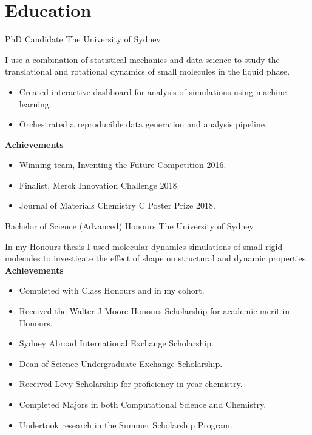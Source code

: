 



\makecvtitle{}

\vspace{-4em}
\section{Education}

{PhD Candidate}
{The University of Sydney}{}{}
{%
  I use a combination of statistical mechanics and data science to
  study the translational and rotational dynamics
  of small molecules in the liquid phase.
\begin{itemize}
  \item Created interactive dashboard for analysis of simulations
    using machine learning.
  \item Orchestrated a reproducible data generation and analysis pipeline.
\end{itemize}
\textbf{Achievements}
\begin{itemize}
  \item Winning team, Inventing the Future Competition 2016.
  \item Finalist, Merck Innovation Challenge 2018.
  \item Journal of Materials Chemistry C Poster Prize 2018.
\end{itemize}
}
\vspace{1em}

{Bachelor of Science (Advanced) Honours}
{The University of Sydney}{}{}
{%
  In my Honours thesis
  I used molecular dynamics simulations of small rigid molecules
  to investigate the effect of shape on structural and dynamic properties.\\
\textbf{Achievements}
\begin{itemize}
  \item Completed with  Class Honours and  in my cohort.
  \item Received the Walter J Moore Honours Scholarship for academic merit in Honours.
  \item Sydney Abroad International Exchange Scholarship.
  \item Dean of Science Undergraduate Exchange Scholarship.
  \item Received Levy Scholarship for proficiency in  year chemistry.
  \item Completed Majors in both Computational Science and Chemistry.
  \item Undertook research in the Summer Scholarship Program.
\end{itemize}
}
\vspace{1em}

